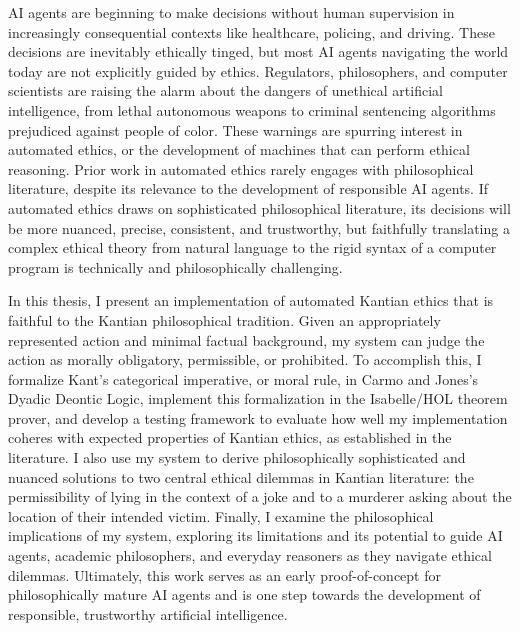%
\begin{isabellebody}%
%
%
\isadelimtheory
%
\endisadelimtheory
%
\isatagtheory
%
\endisatagtheory
{\isafoldtheory}%
%
\isadelimtheory
%
\endisadelimtheory
%
\begin{isamarkuptext}%
AI agents are beginning to make decisions without human supervision in increasingly consequential 
contexts like healthcare, policing, and driving. These decisions are inevitably ethically tinged, 
but most AI agents navigating the world today are not explicitly guided by ethics.
Regulators, philosophers, and computer scientists are raising the alarm about the 
dangers of unethical artificial intelligence, from lethal autonomous weapons to criminal
sentencing algorithms prejudiced against people of color. These warnings are spurring interest in 
automated ethics, or the development of machines that can perform ethical reasoning. Prior work in 
automated ethics rarely engages with philosophical literature, despite its relevance to the 
development of responsible AI agents. If automated ethics draws on sophisticated philosophical
literature, its decisions will be more nuanced, precise, consistent, and trustworthy, but faithfully
translating a complex ethical theory from natural language to the rigid syntax of a computer program is
technically and philosophically challenging.

In this thesis, I present an implementation of automated Kantian
ethics that is faithful to the Kantian philosophical tradition. Given an appropriately represented 
action and minimal factual background, my system can judge the action as morally obligatory, permissible, or prohibited.
To accomplish this, I formalize Kant's categorical imperative, or moral rule,
in Carmo and Jones's Dyadic Deontic Logic, implement this formalization 
in the Isabelle/HOL theorem prover, and develop a testing framework to evaluate how well 
my implementation coheres with expected properties of Kantian ethics, as established in the literature. 
I also use my system to derive philosophically sophisticated and nuanced solutions to two central ethical 
dilemmas in Kantian literature: the permissibility of lying in the context of a joke and to a murderer 
asking about the location of their intended victim. Finally, I examine the philosophical implications 
of my system, exploring its limitations and its potential to guide AI agents, academic philosophers, 
and everyday reasoners as they navigate ethical dilemmas. Ultimately, this work serves 
as an early proof-of-concept for philosophically mature AI agents and is one step towards the development 
of responsible, trustworthy artificial intelligence.%
\end{isamarkuptext}\isamarkuptrue%
%
\isadelimtheory
%
\endisadelimtheory
%
\isatagtheory
%
\endisatagtheory
{\isafoldtheory}%
%
\isadelimtheory
%
\endisadelimtheory
%
\end{isabellebody}%
